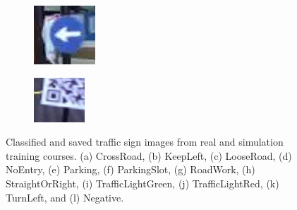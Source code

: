 \begin{figure}[h]
\begin{subfigure}[b]{0.15\linewidth}
    \caption{}
  \end{subfigure}
  \begin{subfigure}[b]{0.15\linewidth}
    \includegraphics[width=\linewidth]{figures/signs/TurnLeft.jpg}
    \caption{}
  \end{subfigure}
  \begin{subfigure}[b]{0.15\linewidth}
    \includegraphics[width=\linewidth]{figures/signs/Negative.jpg}
    \caption{}
  \end{subfigure}
  \caption{Classified and saved traffic sign images from real and simulation
    training courses. (a) CrossRoad, (b) KeepLeft, (c) LooseRoad, (d)
    NoEntry, (e) Parking, (f) ParkingSlot, (g) RoadWork, (h) StraightOrRight,
    (i) TrafficLightGreen, (j) TrafficLightRed, (k) TurnLeft, and (l)
    Negative.} \label{figure:traffic-sign-classes}
\end{figure}

